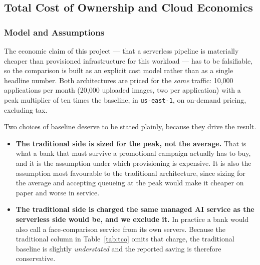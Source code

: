 \subsection{Total Cost of Ownership and Cloud Economics}\label{sec:cost}

\subsubsection{Model and Assumptions}\label{sec:cost:model}

The economic claim of this project --- that a serverless pipeline is materially
cheaper than provisioned infrastructure for this workload --- has to be
falsifiable, so the comparison is built as an explicit cost model rather than as
a single headline number. Both architectures are priced for the \emph{same}
traffic: 10{,}000 applications per month (20{,}000 uploaded images, two per
application) with a peak multiplier of ten times the baseline, in
\texttt{us-east-1}, on on-demand pricing, excluding tax.

Two choices of baseline deserve to be stated plainly, because they drive the
result.

\begin{itemize}
  \item \textbf{The traditional side is sized for the peak, not the average.}
        That is what a bank that must survive a promotional campaign actually
        has to buy, and it is the assumption under which provisioning is
        expensive. It is also the assumption most favourable to the traditional
        architecture, since sizing for the average and accepting queueing at the
        peak would make it cheaper on paper and worse in service.
  \item \textbf{The traditional side is charged the same managed AI service as
        the serverless side would be, and we exclude it.} In practice a bank
        would also call a face-comparison service from its own servers. Because
        the traditional column in Table~\ref{tab:tco} omits that charge, the
        traditional baseline is slightly \emph{understated} and the reported
        saving is therefore conservative.
\end{itemize}

